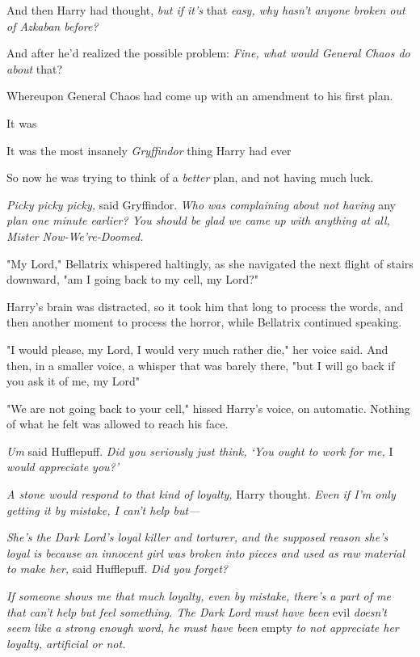 And then Harry had thought, \emph{but if it's} that \emph{easy, why hasn't
anyone broken out of Azkaban before?}

And after he'd realized the possible problem: \emph{Fine, what would General
Chaos do about} that?

Whereupon General Chaos had come up with an amendment to his first plan.

It was{\el}

It was the most insanely \emph{Gryffindor} thing Harry had ever{\el}

So now he was trying to think of a \emph{better} plan, and not having much luck.

\emph{Picky picky picky,} said Gryffindor. \emph{Who was complaining about not
having} any \emph{plan one minute earlier? You should be glad we came up with
anything at all, Mister Now-We're-Doomed.}

"My Lord," Bellatrix whispered haltingly, as she navigated the next flight of
stairs downward, "am I going back to my cell, my Lord?"

Harry's brain was distracted, so it took him that long to process the words,
and then another moment to process the horror, while Bellatrix continued
speaking.

"I would{\el} please, my Lord, I would very much rather die," her voice
said. And then, in a smaller voice, a whisper that was barely there, "but I
will go back if you ask it of me, my Lord{\el}"

"We are not going back to your cell," hissed Harry's voice, on automatic.
Nothing of what he felt was allowed to reach his face.

\emph{Um{\el}} said Hufflepuff. \emph{Did you seriously just think, `You
ought to work for me,} I \emph{would appreciate you?'}

\emph{A stone would respond to that kind of loyalty,} Harry thought. \emph{Even
if I'm only getting it by mistake, I can't help but—}

\emph{She's the Dark Lord's loyal killer and torturer, and the supposed reason
she's loyal is because an innocent girl was broken into pieces and used as raw
material to make her,} said Hufflepuff. \emph{Did you forget?}

\emph{If someone shows me that much loyalty, even by mistake, there's a part of
me that can't help but feel something. The Dark Lord must have been{\el}}
evil \emph{doesn't seem like a strong enough word, he must have been}
empty\emph{{\el} to not appreciate her loyalty, artificial or not.}

